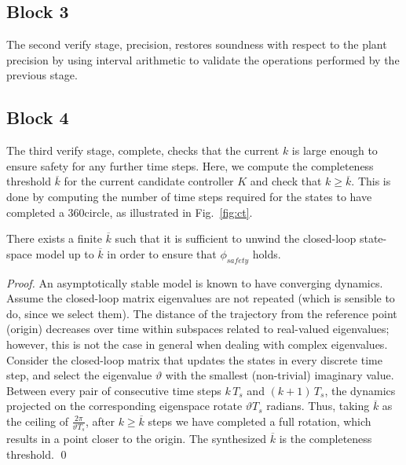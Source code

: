 \subsection{Block 3}

The second {\sc verify} stage, {\sc precision}, 
 restores soundness with respect to the plant precision
by using interval arithmetic \cite{moore1966interval} to validate the 
operations performed by the previous stage. 

\subsection{Block 4}

The third {\sc verify} stage, {\sc complete}, checks that the current
$k$ is large enough to ensure safety for any further time steps.  
Here, we compute the completeness threshold $\overline{k}$ for the current candidate controller $K$ and
check that $k{\geq}\overline{k}$.  This is done by computing the number of time steps
required for the states to have completed a 360\textdegree circle, as illustrated in Fig.~\ref{fig:ct}. 

\begin{theorem} There exists a finite $\overline{k}$ such that it is
sufficient to unwind the closed-loop state-space model up to $\overline{k}$
in order to ensure that $\phi_\mathit{safety}$ holds. 
\end{theorem}

\begin{proof}
%
An asymptotically stable model is known to have converging dynamics.  Assume the
closed-loop matrix eigenvalues are not repeated (which is sensible to do,
since we select them).  The distance of the trajectory from the reference
point (origin) decreases over time within subspaces related to real-valued
eigenvalues; however, this is not the case in general when dealing with
complex eigenvalues.  Consider the closed-loop matrix that updates the
states in every discrete time step, and select the eigenvalue $\vartheta$
with the smallest (non-trivial) imaginary value.  Between every pair of
consecutive time steps $k\,T_s$ and $(k+1)\,T_s$, the dynamics projected on
the corresponding eigenspace rotate $\vartheta T_s$ radians.  Thus, taking
$\overline{k}$ as the ceiling of $\frac{2\pi}{\vartheta T_s}$, after
$k{\geq}\overline{k}$ steps we have completed a full rotation, which results
in a point closer to the origin.  The synthesized $\overline{k}$ is the completeness threshold.
\qed 
%
\end{proof}



